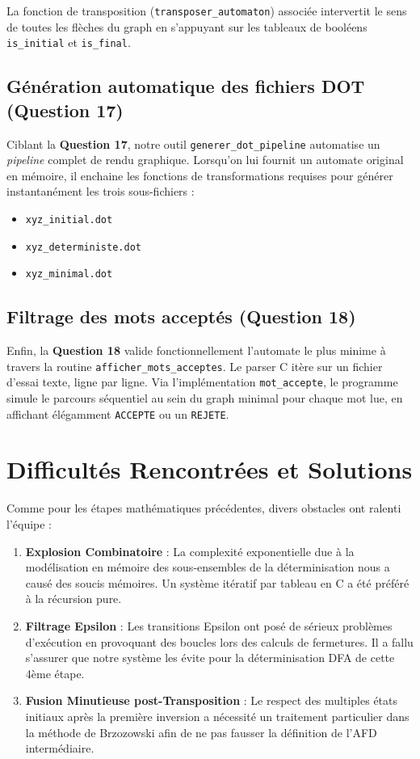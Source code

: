 \documentclass[12pt,a4paper]{article}
\begin{document}
La fonction de transposition (\texttt{transposer\_automaton}) associée intervertit le sens de toutes les flèches du graph en s'appuyant sur les tableaux de booléens \texttt{is\_initial} et \texttt{is\_final}.

\subsection{Génération automatique des fichiers DOT (Question 17)}
Ciblant la \textbf{Question 17}, notre outil \texttt{generer\_dot\_pipeline} automatise un \textit{pipeline} complet de rendu graphique. Lorsqu'on lui fournit un automate original en mémoire, il enchaine les fonctions de transformations requises pour générer instantanément les trois sous-fichiers :
\begin{itemize}
    \item \texttt{xyz\_initial.dot}
    \item \texttt{xyz\_deterministe.dot}
    \item \texttt{xyz\_minimal.dot}
\end{itemize}

\subsection{Filtrage des mots acceptés (Question 18)}
Enfin, la \textbf{Question 18} valide fonctionnellement l'automate le plus minime à travers la routine \texttt{afficher\_mots\_acceptes}. Le parser C itère sur un fichier d'essai texte, ligne par ligne. Via l'implémentation \texttt{mot\_accepte}, le programme simule le parcours séquentiel au sein du graph minimal pour chaque mot lue, en affichant élégamment \texttt{ACCEPTE} ou un \texttt{REJETE}.

\section{Difficultés Rencontrées et Solutions}
Comme pour les étapes mathématiques précédentes, divers obstacles ont ralenti l'équipe :
\begin{enumerate}
    \item \textbf{Explosion Combinatoire} : La complexité exponentielle due à la modélisation en mémoire des sous-ensembles de la déterminisation nous a causé des soucis mémoires. Un système itératif par tableau en C a été préféré à la récursion pure.
    \item \textbf{Filtrage Epsilon} : Les transitions Epsilon ont posé de sérieux problèmes d'exécution en provoquant des boucles lors des calculs de fermetures. Il a fallu s'assurer que notre système les évite pour la déterminisation DFA de cette 4ème étape.
    \item \textbf{Fusion Minutieuse post-Transposition} : Le respect des multiples états initiaux après la première inversion a nécessité un traitement particulier dans la méthode de Brzozowski afin de ne pas fausser la définition de l'AFD intermédiaire.
\end{enumerate}
\end{document}
